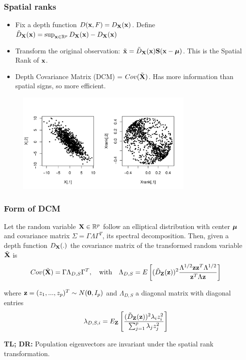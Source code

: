 \documentclass[handout,10pt]{beamer}
\begin{document}
\begin{frame}
\frametitle{Spatial ranks}

\begin{itemize}
\item Fix a depth function $D({\bf{x}}, F) = D_{\mathbf{X}}({\bf{x}})$. Define $ \tilde D_{\mathbf{X}}({\bf{x}}) = \sup_{{\bf{x}}\in \mathbb{R}^p} D_{\mathbf{X}}({\bf{x}}) - D_{\mathbf{X}}({\bf{x}}) $

\item Transform the original observation: $\tilde {{\bf{x}}} = \tilde D_{\mathbf{X}}({\bf{x}}) {\mathbf{S}}({\bf{x}} - {\boldsymbol{\mu}})$. This is the {\colbit Spatial Rank} of ${\bf{x}}$.

\item Depth Covariance Matrix (DCM) = $Cov(\tilde {{\mathbf{X}}})$. Has more information than spatial signs, so more efficient.
\end{itemize}

\begin{figure}\begin{center}
   \includegraphics[height=5cm]{ranks}
   \label{fig:fig3}
\end{center}\end{figure}
\end{frame}

\begin{frame}
\frametitle{Form of DCM}
\begin{theorem}[1]
Let the random variable ${\mathbf{X}} \in \mathbb{R}^p$ follow an elliptical distribution with center ${\boldsymbol{\mu}}$ and covariance matrix $\Sigma = \Gamma\Lambda\Gamma^T$, its spectral decomposition. Then, given a depth function $D_{\mathbf{X}}(.)$ the covariance matrix of the transformed random variable $\tilde{{\mathbf{X}}}$ is
\begin{equation}
Cov(\tilde {{\mathbf{X}}}) = \Gamma \Lambda_{D,S} \Gamma^T,\quad\mbox{with}\quad \Lambda_{D,S} = E \left[ (\tilde D_{\mathbf{Z}}({\bf{z}}))^2 \frac{\Lambda^{1/2} {\bf{z}} {\bf{z}}^T \Lambda^{1/2}}{{\bf{z}}^T \Lambda {\bf{z}}} \right]
\end{equation}

where ${\bf{z}} = (z_1,...,z_p)^T \sim N({\bf 0}, I_p)$ and $\Lambda_{D,S}$ a diagonal matrix with diagonal entries
$$ \lambda_{D,S,i} = E_{\mathbf{Z}} \left[ \frac{(\tilde D_{\mathbf{Z}}({\bf{z}}))^2 \lambda_i z_i^2}{\sum_{j=1}^p \lambda_j z_j^2} \right] $$
\end{theorem}

\vspace{.5cm}
{\colb \textbf{TL; DR:} Population eigenvectors are invariant under the spatial rank transformation.}
\end{frame}
\end{document}
